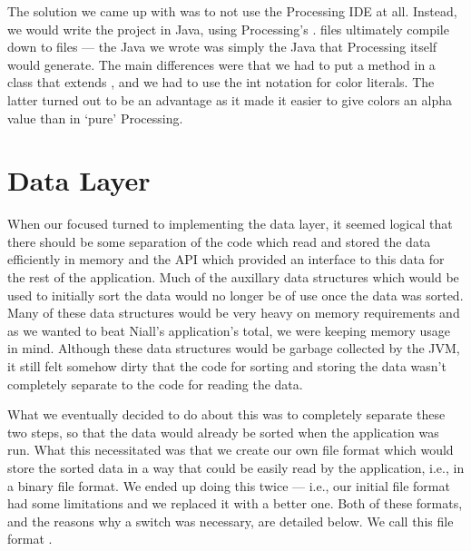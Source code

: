 The solution we came up with was to not use the Processing IDE at all. Instead, we would write the project in Java, using Processing's .  files ultimately compile down to  files --- the Java we wrote was simply the Java that Processing itself would generate. The main differences were that we had to put a  method in a class that extends , and we had to use the  int notation for color literals. The latter turned out to be an advantage as it made it easier to give colors an alpha value than in `pure' Processing.

\section{Data Layer}
When our focused turned to implementing the data layer, it seemed logical that there should be some separation of the code which read and stored the data efficiently in memory and the API which provided an interface to this data for the rest of the application. Much of the auxillary data structures which would be used to initially sort the data would no longer be of use once the data was sorted. Many of these data structures would be very heavy on memory requirements and as we wanted to beat Niall's application's total, we were keeping memory usage in mind. Although these data structures would be garbage collected by the JVM, it still felt somehow dirty that the code for sorting and storing the data wasn't completely separate to the code for reading the data.

What we eventually decided to do about this was to completely separate these two steps, so that the data would already be sorted when the application was run. What this necessitated was that we create our own file format which would store the sorted data in a way that could be easily read by the application, i.e., in a binary file format. We ended up doing this twice --- i.e., our initial file format had some limitations and we replaced it with a better one. Both of these formats, and the reasons why a switch was necessary, are detailed below. We call this file format .

